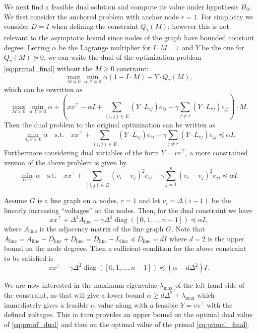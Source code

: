 \documentclass{article}
\DeclareMathOperator{\diag}{diag}
\begin{document}
We next find a feasible dual solution and compute its value under hypothesis $H_0$. We first consider the anchored problem with anchor node $r = 1$. For simplicity we consider $D = I$ when defining the constraint $Q_\gamma(M)$; however this is not relevant to the asymptotic bound since nodes of the graph have bounded constant degree. 
Letting $\alpha$ be the Lagrange multiplier for $I \cdot M = 1$ and $Y$ be the one for $Q_\gamma(M) \succeq 0$, we can write the dual of the optimization problem \eqref{eq:primal_final} without the $M \geq 0$ constraint:
\[ \max_{M \succeq 0} \min_{\alpha, Y \succeq 0} \alpha (1 - I \cdot M) + Y \cdot Q_\gamma(M),\]
which can be rewritten as
\[ \max_{M \succeq 0} \min_{\alpha, Y \succeq 0} \alpha + \left( x x^\top - \alpha I + \sum_{(i,j) \in E} (Y \cdot L_{ij}) e_{ij} - \gamma \sum_{j \neq r} (Y \cdot L_{rj}) e_{jj} \right) \cdot M.\]
Then the dual problem to the original optimization can be written as
\begin{equation}\label{eq:proof_dual}
  \min_{\alpha, Y \succeq 0} \alpha \quad \mathrm{ s.t. } \quad x x^\top + \sum_{(i,j) \in E} (Y \cdot L_{ij}) e_{ij} - \gamma \sum_{j \neq r} (Y \cdot L_{rj}) e_{jj} \preceq \alpha I.
\end{equation}
Furthermore considering dual variables of the form $Y = v v^\top$, a more constrained version of the above problem is given by
\[ \min_{\alpha, v} \, \alpha \quad \mathrm{ s.t. } \quad x x^\top + \sum_{(i,j) \in E} (v_i - v_j)^2 e_{ij} - \gamma \sum_{j = 1}^n (v_r - v_j)^2 e_{jj} \preceq \alpha I. \]

Assume $G$ is a line graph on $n$ nodes, $r = 1$ and let $v_i = \Delta (i-1)$ be the linearly increasing ``voltages'' on the nodes. Then, for the dual constraint we have
\[ x x^\top + \Delta^2 A_{\mathrm{line}} - \gamma \Delta^2 \diag([0,1,\ldots,n-1]) \preceq \alpha I,\]
where $A_{\mathrm{line}}$ is the adjacency matrix of the line graph $G$. Note that $A_{\mathrm{line}} = A_{\mathrm{line}} - D_{\mathrm{line}} + D_{\mathrm{line}} = D_{\mathrm{line}} - L_{\mathrm{line}} \preceq D_{\mathrm{line}} = d I$ where $d = 2$ is the upper bound on the node degrees. Then a sufficient condition for the above constraint to be satisfied is
\[ x x^\top - \gamma \Delta^2 \diag([0,1,\ldots,n-1]) \preceq (\alpha - d \Delta^2) I.\]

We are now interested in the maximum eigenvalue $\lambda_{\max}$ of the left-hand side of the constraint, as that will give a lower bound $\alpha \geq d \Delta^2 + \lambda_{\max}$ which immediately gives a feasible $\alpha$ value along with a feasible $Y = v v^\top$ with the defined voltages. This in turn provides an upper bound on the optimal dual value of \eqref{eq:proof_dual} and thus on the optimal value of the primal \eqref{eq:primal_final}.
\end{document}
